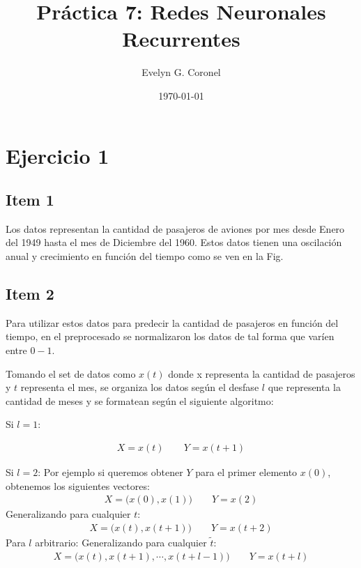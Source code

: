  
\usepackage{multirow}
\usepackage{paralist}


\title{Práctica 7: Redes Neuronales Recurrentes }
\author{Evelyn G. Coronel}


\date[]{\lowercase{\today}} 

\maketitle

\section*{Ejercicio 1}
\subsection*{Item 1}

Los datos representan la cantidad de pasajeros de aviones por mes desde Enero del 1949 hasta el mes de Diciembre del 1960. Estos datos tienen una oscilación anual y crecimiento en función del tiempo como se ven en la Fig.\,

\subsection*{Item 2}

Para utilizar estos datos para predecir la cantidad de pasajeros en función del tiempo, en el preprocesado se normalizaron los datos de tal forma que varíen entre $0-1$. 

Tomando el set de datos como $x(t)$ donde x representa la cantidad de pasajeros y $t$ representa el mes, se organiza los datos según el desfase $l$ que representa la cantidad de meses y se formatean según el siguiente algoritmo:


	 Si  $l=1$:

	\begin{align*}
		X = x(t) \qquad Y = x(t+1)
	\end{align*}
	
	 Si $l=2$:
	Por ejemplo si queremos obtener $Y$ para el primer  elemento $x(0)$, obtenemos los siguientes vectores:
	\begin{align*}
		X = \big ( x(0), x(1) \big ) \qquad Y = x(2)
	\end{align*}
	Generalizando para cualquier $t$:
	\begin{align*}
		X = \big ( x(t), x(t+1) \big ) \qquad Y = x(t+2)
	\end{align*}
	 Para $l$ arbitrario:
	Generalizando para cualquier $\tilde{t}$:
	\begin{align*}
		X = \big ( x(t), x(t+1),\cdots, x(t+l-1) \big ) \qquad Y = x(t+l)
	\end{align*}

